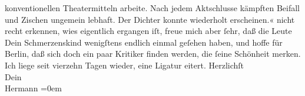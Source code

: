 \begin{ledgroupsized}[t]{13cm}
{{{                     konventionellen Theatermitteln arbeite. Nach jedem Aktschlusse kämpften Beifall
                     und Zischen ungemein lebhaft. Der Dichter konnte wiederholt
                  erscheinen.«}}}\label{K_L01276_1h} nicht recht erkennen, wies eigentlich ergangen iſt,
               freue mich aber ſehr, daß die Leute Dein Schmerzenskind wenigſtens endlich einmal geſehen haben, und
               hoffe für Berlin, daß sich doch ein paar Kritiker
               finden werden, die ſeine Schönheit merken.\pend
           \pstart
           Ich liege seit vierzehn Tagen wieder, eine Ligatur eitert.\pend
           \pstart
           Herzlichſt{\\[\baselineskip]}Dein{\\[\baselineskip]}\spacefill\mbox{Hermann}\pend
           \leftskip=0em{}\endnumbering{}\end{ledgroupsized}  \newcommand{\dateiname}{L01276}\newcommand{\titel}{Hermann Bahr an Arthur Schnitzler, 15. 3. 1903}\newcommand{\editorInnen}{ Kurt Ifkovits,  Martin Anton Müller}
      